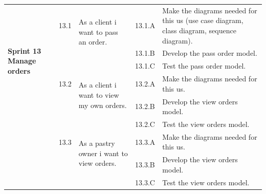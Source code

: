 \documentclass[12pt,a4paper]{report}
\begin{document}
\begin{table}[H]
	\begin{center}
		
		\setlength\doublerulesep{0.5pt}
		\begin{tabular}{|  p{3cm}|  p{1cm}| p{4cm}|  p{1cm}| p{6cm}|}
			
			\hline
			\multirow{5}{3cm}{\textbf{Sprint 13} \textbf{Manage orders} }
			&                       
			13.1  &  
			\multirow{2}{4cm}{As a client i want to pass an order.}
			
			&				                      
			13.1.A &                        
			Make the diagrams needed for this \ac{us} (use case diagram, class diagram, sequence diagram).
			\\ 
			\cline{4-5}    
			&                   
			&                                 
			&                        
			13.1.B &                        
			Develop the pass order model.
			\\ 
			\cline{4-5}    
			&                   
			&                                 
			&                        
			13.1.C &                        
			Test the pass order model.
			\\
			\cline{2-5}  
			
			&                       
			13.2  &  
			\multirow{2}{4cm}{As a client i want to view my own orders.}
			
			&				                      
			13.2.A &                        
			Make the diagrams needed for this \ac{us}.
			\\ 
			\cline{4-5}    
			&                   
			&                                 
			&                        
			13.2.B &                        
			Develop the view orders model.
			\\ 
			\cline{4-5}    
			&                   
			&                                 
			&                        
			13.2.C &                        
			Test the view orders model.
			\\
			\cline{2-5}  
			
			&                       
			13.3  &  
			\multirow{2}{4cm}{As a pastry owner i want to view orders.}
			
			&				                      
			13.3.A &                        
			Make the diagrams needed for this \ac{us}.
			\\ 
			\cline{4-5}    
			&                   
			&                                 
			&                        
			13.3.B &                        
			Develop the view orders model.
			\\ 
			\cline{4-5}    
			&                   
			&                                 
			&                        
			13.3.C &                        
			Test the view orders model.
			\\
			\cline{2-5}  
			

\end{tabular}
\end{center}
\end{table}
\end{document}
